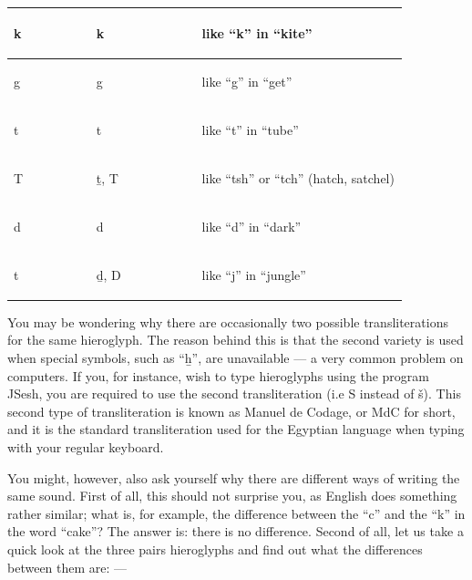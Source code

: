 \documentclass[a5paper,twoside,11pt]{report}
\begin{document}
\begin{center}
\begin{longtable}{p{0.18\linewidth} | p{0.23\linewidth} | p{0.45\linewidth}}
        \begin{hieroglyph}k\end{hieroglyph} & k & like “k” in “kite” \\
        \hline
        \begin{hieroglyph}g\end{hieroglyph} & g & like “g” in “get” \\
        \hline
        \begin{hieroglyph}t\end{hieroglyph} & t & like “t” in “tube” \\
        \hline
        \begin{hieroglyph}T\end{hieroglyph} & ṯ, T & like “tsh” or “tch” (hatch, satchel) \\
        \hline
        \begin{hieroglyph}d\end{hieroglyph} & d & like “d” in “dark” \\
        \hline
        \begin{hieroglyph}t\end{hieroglyph} & ḏ, D & like “j” in “jungle” \\
        \hline
      \end{longtable}
    \end{center}

    You may be wondering why there are occasionally two possible transliterations for the same hieroglyph. The reason behind this is that the second variety is used when special symbols, such as “ẖ”, are unavailable — a very common problem on computers. If you, for instance, wish to type hieroglyphs using the program JSesh, you are required to use the second transliteration (i.e S instead of š). This second type of transliteration is known as Manuel de Codage, or MdC for short, and it is the standard transliteration used for the Egyptian language when typing with your regular keyboard.

    You might, however, also ask yourself why there are different ways of writing the same sound. First of all, this should not surprise you, as English does something rather similar; what is, for example, the difference between the “c” and the “k” in the word “cake”? The answer is: there is no difference. Second of all, let us take a quick look at the three pairs hieroglyphs and find out what the differences between them are: —
\end{document}
